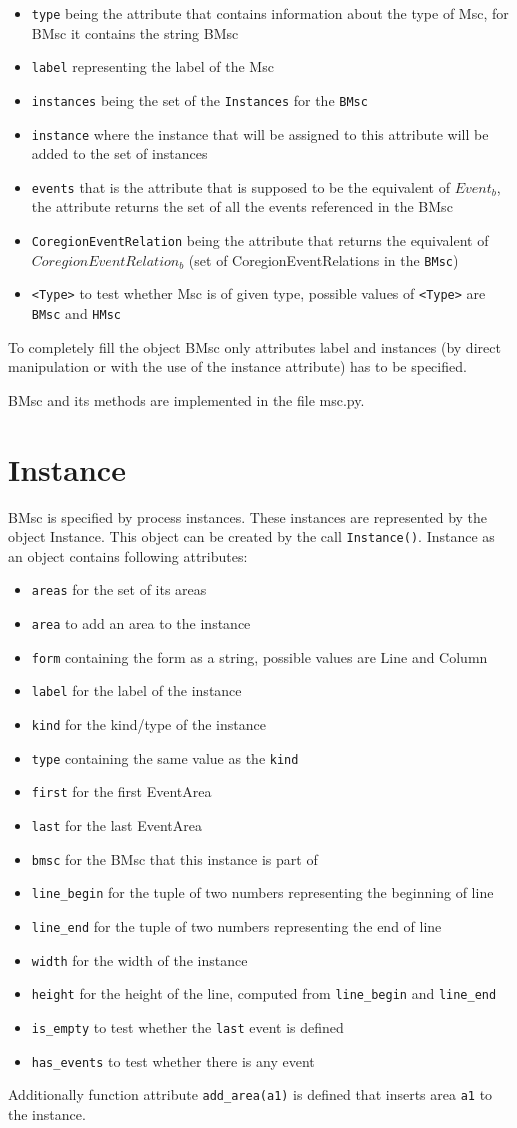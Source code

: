 \documentclass[11pt,oneside]{fithesis2}
\newcommand{\T}[1]{\texttt{#1}}
\newcommand{\ite}[1]{\item{\texttt{#1}}}
\begin{document}
\begin{itemize}
\ite{type} being the attribute that contains information about the type of Msc, for BMsc it contains the string BMsc
\ite{label} representing the label of the Msc
\ite{instances} being the set of the \T{Instances} for the \T{BMsc}
\ite{instance} where the instance that will be assigned to this attribute will be added to the set of instances
\ite{events} that is the attribute that is supposed to be the equivalent of $Event_b$, the attribute returns the set of all the events referenced in the BMsc
\ite{CoregionEventRelation} being the attribute that returns the equivalent of $CoregionEventRelation_b$ (set of CoregionEventRelations in the \T{BMsc})
\ite{<Type>} to test whether Msc is of given type, possible values of \T{<Type>} are \T{BMsc} and \T{HMsc}
\end{itemize}

To completely fill the object BMsc only attributes label and instances (by direct manipulation or with the use of the instance attribute) has to be specified.

BMsc and its methods are implemented in the file msc.py.


\section{Instance}
BMsc is specified by process instances. These instances are represented by the object Instance. This object can be created by the call \T{Instance()}. Instance as an object contains following attributes:
\begin{itemize}
\ite{areas} for the set of its areas
\ite{area} to add an area to the instance
\ite{form} containing the form as a string, possible values are Line and Column
\ite{label} for the label of the instance
\ite{kind} for the kind/type of the instance
\ite{type} containing the same value as the \T{kind}
\ite{first} for the first EventArea
\ite{last} for the last EventArea
\ite{bmsc} for the BMsc that this instance is part of
\ite{line\_begin} for the tuple of two numbers representing the beginning of line
\ite{line\_end} for the tuple of two numbers representing the end of line
\ite{width} for the width of the instance
\ite{height} for the height of the line, computed from \texttt{line\_begin} and \texttt{line\_end}
\ite{is\_empty} to test whether the \texttt{last} event is defined
\ite{has\_events} to test whether there is any event
\end{itemize}

Additionally function attribute \texttt{add\_area(a1)} is defined that inserts area \texttt{a1} to the instance.
\end{document}
